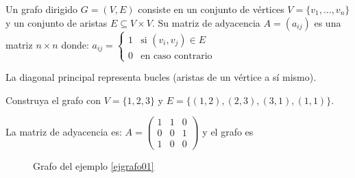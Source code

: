\begin{definition}
Un grafo dirigido $G = (V,E)$ consiste en un conjunto de vértices $V = \{v_1, \dots, v_n\}$ y un conjunto de aristas $E \subseteq V \times V$. Su matriz de adyacencia $A = (a_{ij})$ es una matriz $n \times n$ donde:
\(
a_{ij} = 
\begin{cases} 
1 & \text{si } (v_i, v_j) \in E \\
0 & \text{en caso contrario}
\end{cases}
\)


La diagonal principal representa bucles (aristas de un vértice a sí mismo).
\end{definition}

\begin{example}\label{ejgrafo01} 
Construya el grafo con $V = \{1, 2, 3\}$ y $E = \{(1,2), (2,3), (3,1), (1,1)\}$.
\begin{myproof} La matriz de adyacencia es:
\(
A = \begin{pmatrix}
1 & 1 & 0 \\
0 & 0 & 1 \\
1 & 0 & 0 
\end{pmatrix}
\) y el grafo es

\begin{figure}[H]
\centering
{}
\caption{Grafo del ejemplo \ref{ejgrafo01}}
\end{figure}
\end{myproof}
\end{example}

